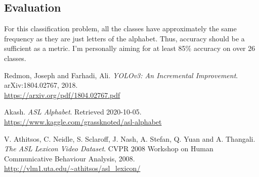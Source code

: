 \documentclass[12pt]{article}
\begin{document}
\subsection{Evaluation}
For this classification problem, all the classes have approximately the
same frequency as they are just letters of the alphabet. Thus, accuracy
should be a sufficient as a metric. I'm personally aiming for at least 85\%
accuracy on over 26 classes.

\begin{thebibliography}{3}

  Redmon, Joseph and Farhadi, Ali.
  \textit{YOLOv3: An Incremental Improvement}.
  arXiv:1804.02767, 2018.
  \\\url{https://arxiv.org/pdf/1804.02767.pdf}

  Akash. \textit{ASL Alphabet}. Retrieved 2020-10-05.
  \\\url{https://www.kaggle.com/grassknoted/asl-alphabet}

  V. Athitsos, C. Neidle, S. Sclaroff, J. Nash, A. Stefan, Q. Yuan and
  A. Thangali.
  \textit{The ASL Lexicon Video Dataset}.
  CVPR 2008 Workshop on Human Communicative Behaviour Analysis, 2008.
  \\\url{http://vlm1.uta.edu/~athitsos/asl_lexicon/}

\end{thebibliography}
\end{document}
